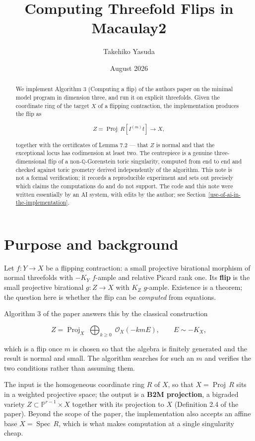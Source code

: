 \documentclass[11pt,reqno]{amsart}
\title{Computing Threefold Flips in Macaulay2}
\author{Takehiko Yasuda}
\date{August 2026}
\newcommand{\PP}{\ensuremath{\mathbb{P}}}
\newcommand{\QQ}{\ensuremath{\mathbb{Q}}}
\newcommand{\sO}{\ensuremath{\mathcal{O}}}
\DeclareMathOperator{\Proj}{Proj}
\DeclareMathOperator{\Spec}{Spec}
\theoremstyle{plain}
\theoremstyle{definition}
\begin{document}
\begin{abstract}
We implement Algorithm 3 (Computing a flip) of the
author\textquotesingle s paper on the minimal model program in dimension
three, and run it on explicit threefolds. Given the coordinate ring of
the target \(X\) of a flipping contraction, the implementation produces
the flip as

\[Z = \Proj\, R[I^{(m)}t] \longrightarrow X,\]

together with the certificates of Lemma 7.2 --- that \(Z\) is normal and
that the exceptional locus has codimension at least two. The centrepiece
is a genuine three-dimensional flip of a non-\QQ{}-Gorenstein toric
singularity, computed from end to end and checked against toric geometry
derived independently of the algorithm. This note is not a formal
verification; it records a reproducible experiment and sets out
precisely which claims the computations do and do not support. The code
and this note were written essentially by an AI system, with edits by
the author; see Section~\ref{use-of-ai-in-the-implementation}.
\end{abstract}

\maketitle

\section{Purpose and background}\label{purpose-and-background}

Let \(f : Y \to X\) be a flipping contraction: a small projective
birational morphism of normal threefolds with \(-K_Y\) \(f\)-ample and
relative Picard rank one. Its \textbf{flip} is the small projective
birational \(g : Z \to X\) with \(K_Z\) \(g\)-ample. Existence is a
theorem; the question here is whether the flip can be \emph{computed}
from equations.

Algorithm 3 of the paper answers this by the classical construction

\[Z = \Proj_X \; \bigoplus_{k \geq 0} \; \sO_X(-kmE), \qquad E \sim -K_X,\]

which is a flip once \(m\) is chosen so that the algebra is finitely
generated and the result is normal and small. The algorithm searches for
such an \(m\) and verifies the two conditions rather than assuming them.

The input is the homogeneous coordinate ring \(R\) of \(X\), so that
\(X = \Proj\, R\) sits in a weighted projective space; the
output is a \textbf{B2M projection}, a bigraded variety
\(Z \subset \PP^{r-1} \times X\) together with its projection to \(X\)
(Definition 2.4 of the paper). Beyond the scope of the paper, the
implementation also accepts an affine base \(X = \Spec\, R\),
which is what makes computation at a single singularity cheap.
\end{document}
